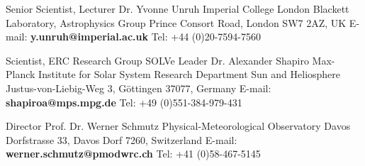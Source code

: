

\begin{cventries}

  \cventry
    {Senior Scientist, Lecturer} %
    {Dr. Yvonne Unruh} %
    {} %
    {} %
    {Imperial College London\newline
     Blackett Laboratory, Astrophysics Group\newline
     Prince Consort Road, London SW7 2AZ, UK\newline
     E-mail: \textbf{y.unruh@imperial.ac.uk}\newline
     Tel: +44 (0)20-7594-7560} %

  \cventry
    {Scientist, ERC Research Group SOLVe Leader} %
    {Dr. Alexander Shapiro} %
    {} %
    {} %
    {Max-Planck Institute for Solar System Research\newline
     Department Sun and Heliosphere\newline
     Justus-von-Liebig-Weg 3, G{\"o}ttingen 37077, Germany\newline
     E-mail: \textbf{shapiroa@mps.mpg.de}\newline
     Tel: +49 (0)551-384-979-431} %

  \cventry
    {Director} %
    {Prof. Dr. Werner Schmutz} %
    {} %
    {} %
    {Physical-Meteorological Observatory Davos\newline
     Dorfstrasse 33, Davos Dorf 7260, Switzerland\newline
     E-mail: \textbf{werner.schmutz@pmodwrc.ch}\newline
     Tel: +41 (0)58-467-5145} %

\end{cventries}
